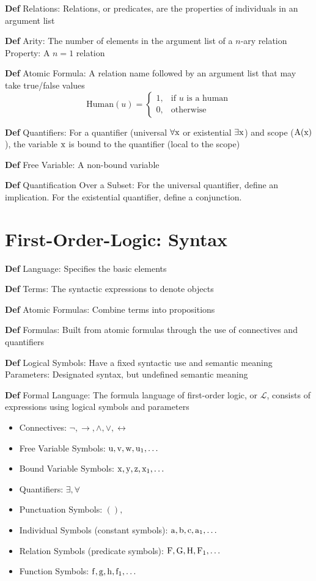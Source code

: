 \documentclass[11pt,notitlepage]{report}
\newcommand{\mc}[1]{\ensuremath{\mathcal{#1}}}
\newcommand{\tbf}[1]{\textbf{#1}}
\begin{document}
\tbf{Def} Relations: Relations, or predicates, are the properties of individuals in an argument list

\tbf{Def} Arity: The number of elements in the argument list of a $n$-ary relation\\
\hspace*{5mm} Property: A $n=1$ relation

\tbf{Def} Atomic Formula: A relation name followed by an argument list that may take true/false values
$$\text{Human}(u) = \begin{cases} 1, &\text{if }u\text{ is a human}\\0, &\text{otherwise}\end{cases}$$

\tbf{Def} Quantifiers: For a quantifier (universal $\forall \rm x$ or existential $\exists \rm x$) and scope ($\rm A(x)$), the variable $\rm x$ is bound to the quantifier (local to the scope)

\tbf{Def} Free Variable: A non-bound variable 

\tbf{Def} Quantification Over a Subset: For the universal quantifier, define an implication. For the existential quantifier, define a conjunction.


\section{First-Order-Logic: Syntax}

\tbf{Def} Language: Specifies the basic elements

\tbf{Def} Terms: The syntactic expressions to denote objects

\tbf{Def} Atomic Formulas: Combine terms into propositions

\tbf{Def} Formulas: Built from atomic formulas through the use of connectives and quantifiers

\tbf{Def} Logical Symbols: Have a fixed syntactic use and semantic meaning\\
\hspace*{5mm} Parameters: Designated syntax, but undefined semantic meaning

\tbf{Def} Formal Language: The formula language of first-order logic, or $\mc L$, consists of expressions using logical symbols and parameters
\begin{itemize}
    \item Connectives: $\neg, \to, \wedge, \vee, \leftrightarrow$
    \item Free Variable Symbols: $\rm u, v, w, u_1, \dots$
    \item Bound Variable Symbols: $\rm x, y, z, x_1, \dots$
    \item Quantifiers: $\exists, \forall$
    \item Punctuation Symbols: $( ) ,$
    \item Individual Symbols (constant symbols): $\rm a, b, c , a_1, \dots$
    \item Relation Symbols (predicate symbols): $\rm F, G, H, F_1, \dots$
    \item Function Symbols: $\rm f, g, h, f_1, \dots$
\end{itemize}
\end{document}
